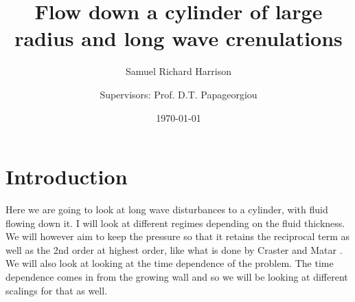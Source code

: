 \documentclass[12pt]{article}
\title{Flow down a cylinder of large radius and long wave crenulations}
\author[1,2]{Samuel Richard Harrison}
\author[2]{\authorcr Supervisors: Prof. D.T. Papageorgiou}
\affil[1]{ University of Reading}
\affil[2]{Imperial College London}
\date{\today}
\begin{document}
\maketitle

\begin{abstract}
	
\end{abstract}
\section{Introduction}
Here we are going to look at long wave disturbances to a cylinder, with fluid flowing down it. I will look at different regimes depending on the fluid thickness. We will however aim to keep the pressure so that it retains the reciprocal term as well as the 2nd order at highest order, like what is done by Craster and Matar \cite{CRASTER_2006}. We will also look at looking at the time dependence of the problem. The time dependence comes in from the growing wall and so we will be looking at different scalings for that as well.
\end{document}

